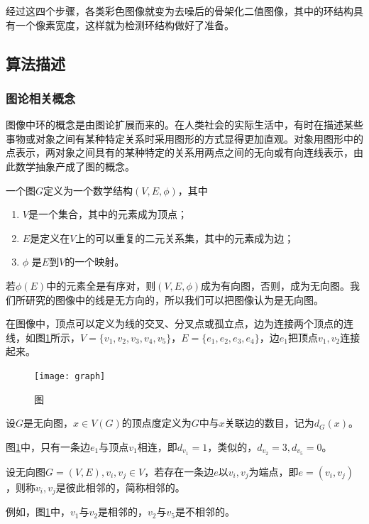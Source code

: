 经过这四个步骤，各类彩色图像就变为去噪后的骨架化二值图像，其中的环结构具有一个像素宽度，这样就为检测环结构做好了准备。

\subsection{算法描述}
\label{}
\subsubsection{图论相关概念}
\label{}

图像中环的概念是由图论扩展而来的。在人类社会的实际生活中，有时在描述某些事物或对象之间有某种特定关系时采用图形的方式显得更加直观。对象用图形中的点表示，两对象之间具有的某种特定的关系用两点之间的无向或有向连线表示，由此数学抽象产成了图的概念。

\begin{definition}
一个图$G$定义为一个数学结构$(V, E, \phi)$\cite{xujunming}，其中
\begin{enumerate}
\item $V$是一个集合，其中的元素成为顶点；
\item $E$是定义在$V$上的可以重复的二元关系集，其中的元素成为边；
\item $\phi$ 是$E$到$V$的一个映射。 
\end{enumerate}
若$\phi(E)$中的元素全是有序对，则$(V, E, \phi)$成为有向图，否则，成为无向图。我们所研究的图像中的线是无方向的，所以我们可以把图像认为是无向图。
\end{definition}

在图像中，顶点可以定义为线的交叉、分叉点或孤立点，边为连接两个顶点的连线，如图\ref{fig:graph}所示，$V = \{v_1, v_2, v_3, v_4, v_5\}$，$E = \{e_1, e_2, e_3, e_4\}$，边$e_1$把顶点$v_1, v_2$连接起来。

\begin{figure}[H] %
  \centering
  \texttt{[image: graph]}
  \caption{图}
  \label{fig:graph}
\end{figure}

\begin{definition}
设$G$是无向图，$x\in V(G)$的顶点度定义为$G$中与$x$关联边的数目，记为$d_{G}(x)$\cite{wangshuhe}。
\end{definition}

图\ref{fig:graph}中，只有一条边$e_1$与顶点$v_1$相连，即$d_{v_1}=1$，类似的，$d_{v_2}=3, d_{v_5}=0$。


\begin{definition}
设无向图$G = (V, E), v_i, v_j \in V$，若存在一条边$e$以$v_i, v_j$为端点，即$e = (v_i, v_j)$，则称$v_i, v_j$是彼此相邻的，简称相邻的。 
\end{definition}
例如，图\ref{fig:graph}中，$v_1$与$v_2$是相邻的，$v_2$与$v_5$是不相邻的。

